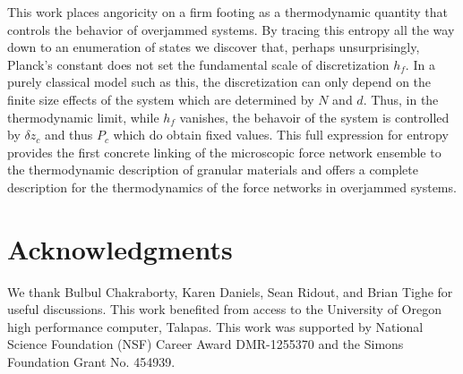 This work places angoricity on a firm footing as a thermodynamic quantity that controls the behavior of overjammed systems.  By tracing this entropy all the way down to an enumeration of states we discover that, perhaps unsurprisingly, Planck's constant does not set the fundamental scale of discretization $h_f$. In a purely classical model such as this, the discretization can only depend on the finite size effects of the system which are determined by $N$ and $d$. Thus, in the thermodynamic limit, while $h_f$ vanishes, the behavoir of the system is controlled by $\delta z_c$ and thus $P_c$ which do obtain fixed values. This full expression for entropy provides the first concrete linking of the microscopic force network ensemble to the thermodynamic description of granular materials and offers a complete description for the thermodynamics of the force networks in overjammed systems.

\section{Acknowledgments} We thank Bulbul Chakraborty, Karen Daniels, Sean Ridout, and Brian Tighe for useful discussions. This work benefited from access to the University of Oregon high performance computer, Talapas. This work was supported by National Science Foundation (NSF) Career Award DMR-1255370 and the Simons Foundation Grant No. 454939.

